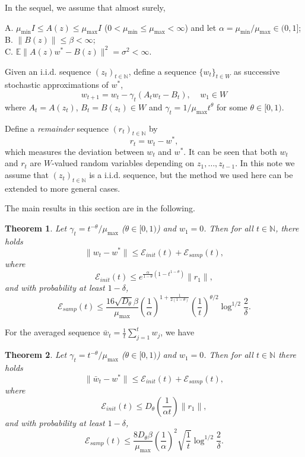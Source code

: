 \documentclass[twoside,twocolumn,journal]{IEEEtran}
\newtheorem{thm}{Theorem}[section]
\newcommand{\DS}{\displaystyle}
\def\N{{\mathbb N}}
\def\E{{\mathbb E}}        %
\def\Err{{\mathscr E}}
\def\amax{{\mu_{\max}}}
\def\amin{{\mu_{\min}} }
\begin{document}
In the sequel, we assume that almost surely,

\medskip

 A. $\amin I\leq  A(z) \leq \amax I$ ($0< \amin\leq \amax < \infty$) and let $\alpha=\amin/\amax\in(0,1]$; \\
B. $\|B(z)\|\leq \beta<\infty$; \\
C. $\E \|A(z) w^\ast - B(z) \|^2 = \sigma^2 <\infty$.

\medskip

Given an i.i.d. sequence $(z_t)_{t\in \N}$, define a sequence $\{w_t\}_{t\in W}$ as successive stochastic approximations of $w^\ast$,
\begin{equation}\label{eq:wt}
w_{t+1} = w_t - \gamma_t (A_t w_t - B_t), \ \ \ \ \ \mbox{$w_1\in W$}
\end{equation}
where $A_t=A(z_t)$, $B_t=B(z_t)\in W$ and $\gamma_t=1/\amax t^{\theta}$ for some $\theta\in [0,1)$.

Define a \emph{remainder} sequence
$(r_t)_{t\in \N}$ by
\[ r_t = w_t - w^\ast, \]
which measures the deviation between $w_t$ and $w^\ast$.
It can be seen that both $w_t$ and $r_t$ are $W$-valued random
variables depending on $z_1,\ldots,z_{t-1}$. In this note we
assume that $(z_t)_{t\in \N}$ is a i.i.d. sequence, but the method
we used here can be extended to more general cases.

The main results in this section are in the following.

\medskip

\begin{thm} \label{thm:robmon}
Let $\gamma_t = t^{-\theta}/\amax$ ($\theta\in [0,1)$) and $w_1=0$. Then for all $t\in \N$, there holds
\[ \| w_{t} - w^\ast \| \leq \Err_{init}(t) + \Err_{samp}(t), \]
where
\[ \Err_{init}(t)\leq e^{\frac{\alpha}{1-\theta}(1-t^{1-\theta})} \|r_1\|, \]
and with probability at least $1-\delta$,
\[ \Err_{samp}(t) \leq \frac{16\sqrt{D_\theta} \beta}{\amax} \left(\frac{1}{\alpha} \right)^{1+\frac{1}{2(1-\theta)}}
\left(\frac{1}{t}\right)^{\theta/2} \log^{1/2}\frac{2}{\delta}. \]
\end{thm}

\medskip

For the averaged sequence $\DS \bar{w}_t = \frac{1}{t} \sum_{j=1}^t w_j$, we have

\medskip

\begin{thm} \label{thm:average}
Let $\DS \gamma_t = t^{-\theta}/\amax$ ($\theta\in [0,1)$) and $w_1=0$. Then for all $t\in \N$ there holds
\[ \| \bar{w}_t -w^\ast \| \leq \Err_{init}(t) + \Err_{samp}(t), \]
where
\[ \Err_{init}(t)\leq  D_\theta \left(\frac{1}{\alpha t} \right)\|r_1\| , \]
and with probability at least $1-\delta$,
\[ \Err_{samp}(t) \leq  \frac{8 D_\theta \beta}{\amax} \left(\frac{1}{\alpha}\right)^2 \sqrt{\frac{1}{t}} \log^{1/2} \frac{2}{\delta}. \]
\end{thm}
\end{document}
